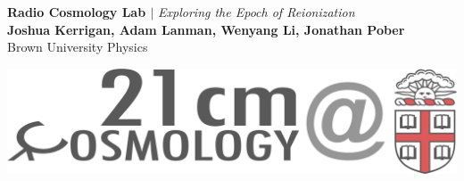 \documentclass[a0,landscape]{a0poster}
\begin{document}

\begin{minipage}[b]{0.5\textwidth}
\veryHuge \color{NavyBlue} \textbf{Radio Cosmology Lab $|$} \color{Black}\LARGE\textit{Exploring the Epoch of Reionization}\\
\huge \textbf{Joshua Kerrigan, Adam Lanman, Wenyang Li, Jonathan Pober}\\ %
\huge Brown University Physics\\ %
\end{minipage}
\begin{minipage}[b]{0.6\linewidth}
\includegraphics[width=45cm]{radiologo.png} %
\end{minipage}

\end{document}
